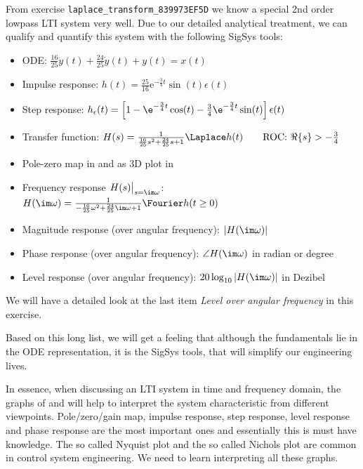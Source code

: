 From exercise \texttt{laplace\_transform\_839973EF5D} we know a special 2nd order lowpass LTI system very well.
Due to our detailed analytical treatment, we can qualify and quantify this system
with the following SigSys tools:
\begin{itemize}
\setlength\itemsep{-0.25em}
  \item ODE: $\frac{16}{25} \ddot{y}(t) + \frac{24}{25} \dot{y}(t) + y(t) = x(t)$
  \item Impulse response: $h(t) = \frac{25}{16} \mathrm{e}^{-\frac{3}{4} t} \sin(t) \epsilon(t)$
  \item Step response: $h_\epsilon(t)=\left[1
  - \e^{-\frac{3}{4} t} \cos(t)
  - \frac{3}{4}\e^{-\frac{3}{4} t} \sin(t) \right]\epsilon(t)$
  \item Transfer function:
  $H(s) = \frac{1}{\frac{16}{25} s^2 + \frac{24}{25} s + 1}\Laplace h(t)
  \qquad\text{ROC: }\Re\{s\}>-\frac{3}{4}$
  \item Pole-zero map in  and as 3D plot in
  \item Frequency response $H(s)\big|_{s=\im\omega}$:
  $H(\im\omega) = \frac{1}{-\frac{16}{25}\omega^2 + \frac{24}{25}\im\omega  + 1}
  \Fourier h(t \geq 0)$
  \item Magnitude response (over angular frequency): $|H(\im\omega)|$
  \item Phase response (over angular frequency): $\angle H(\im\omega)$ in radian or degree
  \item Level response (over angular frequency): $20 \log_{10}|H(\im\omega)|$ in Dezibel
\end{itemize}

We will have a detailed look at the last item \textit{Level over angular frequency}
in this exercise.

Based on this long list, we will get a feeling that although the fundamentals
lie in the ODE representation, it is the SigSys tools, that will simplify our
engineering lives.

\begin{mdframed}
In essence, when discussing an LTI system in time and frequency domain, the
graphs of  and 
will help to interpret the system characteristic from different viewpoints.
Pole/zero/gain map, impulse response, step response, level response and
phase response are the most important
ones and essentially this is must have knowledge.
The so called Nyquist plot and the so called Nichols plot are common in
control system engineering.
We need to learn interpreting all these graphs.
\end{mdframed}




